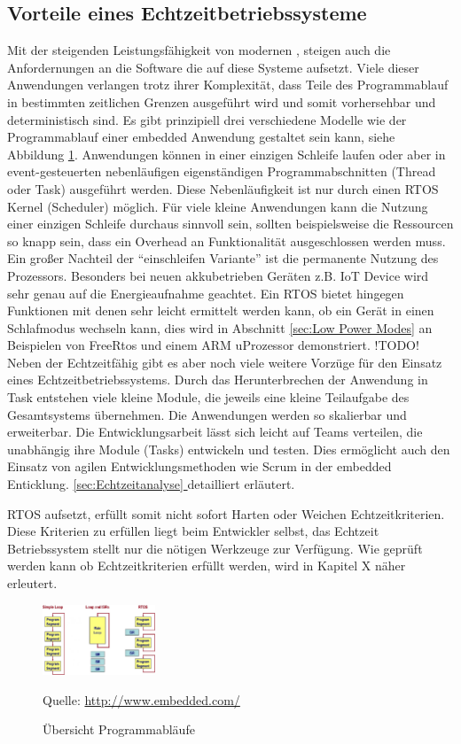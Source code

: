 \documentclass[ngerman]{seminarvorlage}
\newcommand*{\fullref}[1]{\hyperref[{#1}]{\autoref*{#1} \nameref*{#1}}} %
\newcommand*{\quelle}{%
  \footnotesize Quelle: 
}
\begin{document}
\subsection{Vorteile eines Echtzeitbetriebssysteme}
Mit der steigenden Leistungsfähigkeit von modernen \muProzessoren, steigen auch die Anfordernungen an die Software die auf diese Systeme aufsetzt. Viele dieser Anwendungen verlangen trotz ihrer Komplexität, dass Teile des Programmablauf in bestimmten zeitlichen Grenzen ausgeführt wird und somit vorhersehbar und deterministisch sind. Es gibt prinzipiell drei verschiedene Modelle wie der Programmablauf einer embedded Anwendung gestaltet sein kann, siehe Abbildung \ref{fig:Programmablauf}. Anwendungen können in einer einzigen Schleife laufen oder aber in event-gesteuerten nebenläufigen eigenständigen Programmabschnitten (Thread oder Task) ausgeführt werden. Diese Nebenläufigkeit ist nur durch einen RTOS Kernel (Scheduler) möglich. Für viele kleine Anwendungen kann die Nutzung einer einzigen Schleife durchaus sinnvoll sein, sollten beispielsweise die Ressourcen so knapp sein, dass ein Overhead an Funktionalität ausgeschlossen werden muss. Ein großer Nachteil der "`einschleifen Variante"' ist die permanente Nutzung des Prozessors. Besonders bei neuen akkubetrieben Geräten z.B. IoT Device wird sehr genau auf die Energieaufnahme geachtet. Ein RTOS bietet hingegen Funktionen mit denen sehr leicht ermittelt werden kann, ob ein Gerät in einen Schlafmodus wechseln kann, dies wird in Abschnitt \ref{sec:Low Power Modes} an Beispielen von FreeRtos und einem ARM uProzessor demonstriert. 
\newline
!TODO!
\newline
Neben der Echtzeitfähig gibt es aber noch viele weitere Vorzüge für den Einsatz eines Echtzeitbetriebssystems.  
Durch das Herunterbrechen der Anwendung in Task entstehen viele kleine Module, die jeweils eine kleine Teilaufgabe des Gesamtsystems übernehmen. Die Anwendungen werden so skalierbar und erweiterbar. Die Entwicklungsarbeit lässt sich leicht auf Teams verteilen, die unabhängig ihre Module (Tasks) entwickeln und testen. Dies ermöglicht auch den Einsatz von agilen Entwicklungsmethoden wie Scrum in der embedded Enticklung.   
\fullref{sec:Echtzeitanalyse} detailliert erläutert.    

RTOS aufsetzt, erfüllt somit nicht sofort Harten oder Weichen Echtzeitkriterien. Diese Kriterien zu erfüllen liegt beim Entwickler selbst, das Echtzeit Betriebssystem stellt nur die nötigen Werkzeuge zur Verfügung. Wie geprüft werden kann ob Echtzeitkriterien erfüllt werden, wird in Kapitel X näher erleutert.  
\begin{figure}
	\centering
		\includegraphics[width=0.3\textwidth]{Pictures/EmbeddedCom/cwrtos2f5c.jpg}
	\caption{Übersicht Programmabläufe}
	\quelle\url{http://www.embedded.com/}
	\label{fig:Programmablauf}
\end{figure}
\end{document}
